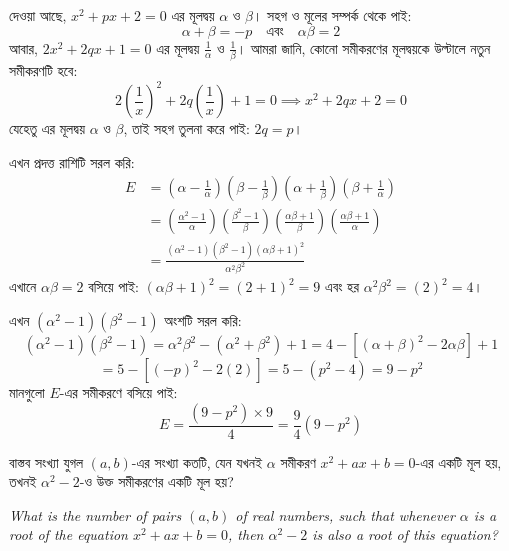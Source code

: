 \documentclass[12pt, a4paper]{article}
\begin{document}
\begin{tcolorbox}[solutionbox={সমাধান (Solution)}]
    \noindent
    দেওয়া আছে, $x^2 + px + 2 = 0$ এর মূলদ্বয় $\alpha$ ও $\beta$। সহগ ও মূলের সম্পর্ক থেকে পাই:
    \[ \alpha+\beta = -p \quad \text{এবং} \quad \alpha\beta = 2 \]
    আবার, $2x^2 + 2qx + 1 = 0$ এর মূলদ্বয় $\frac{1}{\alpha}$ ও $\frac{1}{\beta}$। আমরা জানি, কোনো সমীকরণের মূলদ্বয়কে উল্টালে নতুন সমীকরণটি হবে:
    \[ 2\left(\frac{1}{x}\right)^2 + 2q\left(\frac{1}{x}\right) + 1 = 0 \implies x^2 + 2qx + 2 = 0 \]
    যেহেতু এর মূলদ্বয় $\alpha$ ও $\beta$, তাই সহগ তুলনা করে পাই: $2q = p$।
    
    \vspace{0.5em}
    এখন প্রদত্ত রাশিটি সরল করি:
    \begin{align*}
        E &= \left(\alpha - \frac{1}{\alpha}\right)\left(\beta - \frac{1}{\beta}\right)\left(\alpha + \frac{1}{\beta}\right)\left(\beta + \frac{1}{\alpha}\right) \\
        &= \left(\frac{\alpha^2-1}{\alpha}\right)\left(\frac{\beta^2-1}{\beta}\right)\left(\frac{\alpha\beta+1}{\beta}\right)\left(\frac{\alpha\beta+1}{\alpha}\right) \\
        &= \frac{(\alpha^2-1)(\beta^2-1)(\alpha\beta+1)^2}{\alpha^2\beta^2}
    \end{align*}
    এখানে $\alpha\beta = 2$ বসিয়ে পাই: $(\alpha\beta+1)^2 = (2+1)^2 = 9$ এবং হর $\alpha^2\beta^2 = (2)^2 = 4$।
    
    \vspace{0.5em}
    এখন $(\alpha^2-1)(\beta^2-1)$ অংশটি সরল করি:
    \[ (\alpha^2-1)(\beta^2-1) = \alpha^2\beta^2 - (\alpha^2+\beta^2) + 1 = 4 - [(\alpha+\beta)^2 - 2\alpha\beta] + 1 \]
    \[ = 5 - [(-p)^2 - 2(2)] = 5 - (p^2 - 4) = 9 - p^2 \]
    মানগুলো $E$-এর সমীকরণে বসিয়ে পাই:
    \[ E = \frac{(9-p^2) \times 9}{4} = \frac{9}{4}(9-p^2) \]
\end{tcolorbox}
\vspace{1em}

\begin{tcolorbox}[questionbox={প্রশ্ন (Question) 40}]
    \noindent
    বাস্তব সংখ্যা যুগল $(a, b)$-এর সংখ্যা কতটি, যেন যখনই $\alpha$ সমীকরণ $x^2 + ax + b = 0$-এর একটি মূল হয়, তখনই $\alpha^2 - 2$-ও উক্ত সমীকরণের একটি মূল হয়?
    
    \vspace{0.8em}
    \begin{english}
    \noindent\textit{\color{darkgray}
    What is the number of pairs $(a, b)$ of real numbers, such that whenever $\alpha$ is a root of the equation $x^2 + ax + b = 0$, then $\alpha^2 - 2$ is also a root of this equation?
    }
    \end{english}
\end{tcolorbox}
\end{document}
